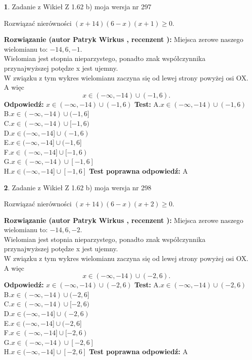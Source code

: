 \documentclass[12pt, a4paper]{article}
\theoremstyle{definition} %
\newtheorem{zad}{}
\newcommand{\zadStart}[1]{\begin{zad}#1\newline}
\newcommand{\zadStop}{\end{zad}}
\newcommand{\rozwStart}[2]{\noindent \textbf{Rozwiązanie (autor #1 , recenzent #2): }\newline}
\newcommand{\rozwStop}{\newline}
\newcommand{\odpStart}{\noindent \textbf{Odpowiedź:}\newline}
\newcommand{\odpStop}{\newline}
\newcommand{\testStart}{\noindent \textbf{Test:}\newline}
\newcommand{\testStop}{\newline}
\newcommand{\kluczStart}{\noindent \textbf{Test poprawna odpowiedź:}\newline}
\newcommand{\kluczStop}{\newline}
\begin{document}
\zadStart{Zadanie z Wikieł Z 1.62 b) moja wersja nr 297}

Rozwiązać nierówności $(x+14)(6-x)(x+1)\ge0$.
\zadStop
\rozwStart{Patryk Wirkus}{}
Miejsca zerowe naszego wielomianu to: $-14, 6, -1$.\\
Wielomian jest stopnia nieparzystego, ponadto znak współczynnika przy\linebreak najwyższej potędze x jest ujemny.\\ W związku z tym wykres wielomianu zaczyna się od lewej strony powyżej osi OX. A więc $$x \in (-\infty,-14) \cup (-1,6).$$
\rozwStop
\odpStart
$x \in (-\infty,-14) \cup (-1,6)$
\odpStop
\testStart
A.$x \in (-\infty,-14) \cup (-1,6)$\\
B.$x \in (-\infty,-14) \cup (-1,6]$\\
C.$x \in (-\infty,-14) \cup [-1,6)$\\
D.$x \in (-\infty,-14] \cup (-1,6)$\\
E.$x \in (-\infty,-14] \cup (-1,6]$\\
F.$x \in (-\infty,-14] \cup [-1,6)$\\
G.$x \in (-\infty,-14) \cup [-1,6]$\\
H.$x \in (-\infty,-14] \cup [-1,6]$
\testStop
\kluczStart
A
\kluczStop



\zadStart{Zadanie z Wikieł Z 1.62 b) moja wersja nr 298}

Rozwiązać nierówności $(x+14)(6-x)(x+2)\ge0$.
\zadStop
\rozwStart{Patryk Wirkus}{}
Miejsca zerowe naszego wielomianu to: $-14, 6, -2$.\\
Wielomian jest stopnia nieparzystego, ponadto znak współczynnika przy\linebreak najwyższej potędze x jest ujemny.\\ W związku z tym wykres wielomianu zaczyna się od lewej strony powyżej osi OX. A więc $$x \in (-\infty,-14) \cup (-2,6).$$
\rozwStop
\odpStart
$x \in (-\infty,-14) \cup (-2,6)$
\odpStop
\testStart
A.$x \in (-\infty,-14) \cup (-2,6)$\\
B.$x \in (-\infty,-14) \cup (-2,6]$\\
C.$x \in (-\infty,-14) \cup [-2,6)$\\
D.$x \in (-\infty,-14] \cup (-2,6)$\\
E.$x \in (-\infty,-14] \cup (-2,6]$\\
F.$x \in (-\infty,-14] \cup [-2,6)$\\
G.$x \in (-\infty,-14) \cup [-2,6]$\\
H.$x \in (-\infty,-14] \cup [-2,6]$
\testStop
\kluczStart
A
\kluczStop
\end{document}
